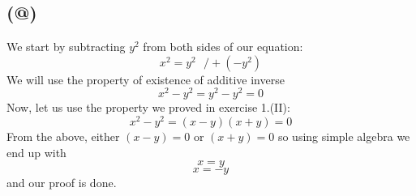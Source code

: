 \documentclass{article}
\makeatletter
\newcommand*{\rom}[1]{\expandafter\@slowromancap\romannumeral #1@}
\makeatother
\begin{document}
\subsection*{(\rom{3})}
We start by subtracting \(y^2\) from both sides of our equation: 
\begin{equation*}
	x^2 = y^2  \ \ \ / +(-y^2) 
\end{equation*}
We will use the property of  existence of additive inverse
\begin{equation*}
	x^2 - y^2 = y^2 - y^2 = 0
\end{equation*}
Now, let us use the property we proved in exercise 1.(II):
\begin{equation*}
	x^2 - y^2 = (x-y)(x+y) = 0
\end{equation*}
From the above, either \((x-y)=0\) or \((x+y) = 0\) so using simple algebra we
end up with
\begin{equation*}
	x = y
\end{equation*}
\begin{equation*}
	x = -y
\end{equation*}
and our proof is done.
\end{document}
